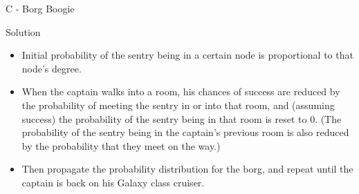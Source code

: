 \renewcommand{\insertshortauthor}{Jon Marius Venstad}
\begin{frame}{C - Borg Boogie}

\begin{block}{Solution}
  \begin{itemize}
	\item Initial probability of the sentry being in a certain node is proportional to that node's degree.
	\item When the captain walks into a room, his chances of success are reduced by the probability of meeting the sentry in or into that room, and (assuming success) the probability of the sentry being in that room is reset to $0$. (The probability of the sentry being in the captain's previous room is also reduced by the probability that they meet on the way.) 
	\item Then propagate the probability distribution for the borg, and repeat until the captain is back on his Galaxy class cruiser. 
  \end{itemize}
\end{block}

\end{frame}
